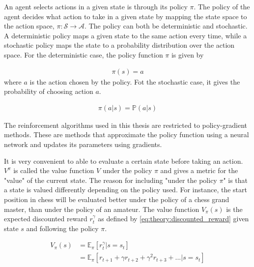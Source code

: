 \documentclass[class=book, crop=false]{standalone}
\begin{document}
An agent selects actions in a given state is through its policy $\pi$. The policy of the agent decides what action to take in a given state by mapping the state space to the action space, $\pi: \mathcal{S} \to \mathcal{A}$. The policy can both be deterministic and stochastic. A deterministic policy maps a given state to the same action every time, while a stochastic policy maps the state to a probability distribution over the action space. For the deterministic case, the policy function $\pi$ is given by


\begin{equation}
   \begin{aligned}\label{eq:theory:policy_function_deterministic}
\pi(s) = a
\end{aligned} 
\end{equation}
where $a$ is the action chosen by the policy. Fot the stochastic case, it gives the probability of choosing action $a$.


\begin{equation}
   \begin{aligned}\label{eq:theory:policy_function_stochastic}
\pi(a|s) = \mathbb{P}(a|s)
\end{aligned} 
\end{equation}


The reinforcement algorithms used in this thesis are restricted to policy-gradient methods. These are methods that approximate the policy function using a neural network and updates its parameters using gradients. 

It is very convenient to able to evaluate a certain state before taking an action. $V^{\pi}$ is called the value function $V$ under the policy $\pi$ and gives a metric for the "value" of the current state. The reason for including "under the policy $\pi$" is that a state is valued differently depending on the policy used. For instance, the start position in chess will be evaluated better under the policy of a chess grand master, than under the policy of an amateur. The value function $V_{\pi}(s)$ is the expected discounted reward $r^{\gamma}_{t}$ as defined by \eqref{eq:theory:discounted_reward} given state $s$ and following the policy $\pi$.

\begin{equation}
   \begin{aligned}\label{eq:theory:value_function}
V_{\pi}(s) 
&= \mathbb{E}_{\pi}[r^{\gamma}_{t}| s=s_{t}]
\\
&= \mathbb{E}_{\pi}[ r_{t+1} + \gamma r_{t+2} + \gamma^{2} r_{t+3} + ...|s=s_{t}]
\end{aligned} 
\end{equation}
\end{document}
